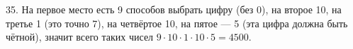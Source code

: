 35. На первое место есть 9 способов выбрать цифру (без 0), на второе 10, на третье 1 (это точно 7), на четвёртое 10, на пятое --- 5 (эта цифра должна быть чётной), значит всего таких чисел $9\cdot10\cdot1\cdot10\cdot5=4500.$\\
